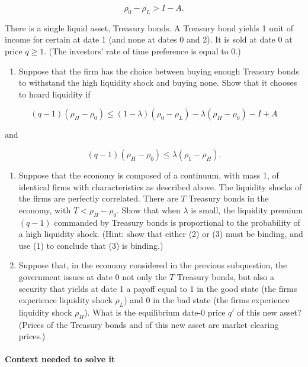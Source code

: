 \documentclass[11pt,a4paper]{article}
\providecommand{\tightlist}{\setlength{\itemsep}{0pt}\setlength{\parskip}{0pt}}
\begin{document}
\[\rho_0 - \rho_L > I - A. \tag{1}\]

There is a single liquid asset, Treasury bonds. A Treasury bond yields 1 unit of income for certain
at date 1 (and none at dates 0 and 2). It is sold at date 0 at price \(q \geqslant 1\). (The
investors' rate of time preference is equal to 0.)

\begin{enumerate}
\def\labelenumi{(\roman{enumi})}
\tightlist
\item
  Suppose that the firm has the choice between buying enough Treasury bonds to withstand the high
  liquidity shock and buying none. Show that it chooses to hoard liquidity if
\end{enumerate}

\[(q-1)(\rho_H - \rho_0) \leqslant (1-\lambda)(\rho_0 - \rho_L) - \lambda(\rho_H - \rho_0) - I + A \tag{2}\]

and

\[(q-1)(\rho_H - \rho_0) \leqslant \lambda(\rho_1 - \rho_H). \tag{3}\]

\begin{enumerate}
\def\labelenumi{(\roman{enumi})}
\setcounter{enumi}{1}
\item
  Suppose that the economy is composed of a continuum, with mass 1, of identical firms with
  characteristics as described above. The liquidity shocks of the firms are perfectly correlated.
  There are \(T\) Treasury bonds in the economy, with \(T < \rho_H - \rho_0\). Show that when
  \(\lambda\) is small, the liquidity premium \((q-1)\) commanded by Treasury bonds is proportional
  to the probability of a high liquidity shock. (Hint: show that either (2) or (3) must be binding,
  and use (1) to conclude that (3) is binding.)
\item
  Suppose that, in the economy considered in the previous subquestion, the government issues at date
  0 not only the \(T\) Treasury bonds, but also a security that yields at date 1 a payoff equal to 1
  in the good state (the firms experience liquidity shock \(\rho_L\)) and 0 in the bad state (the
  firms experience liquidity shock \(\rho_H\)). What is the equilibrium date-0 price \(q'\) of this
  new asset? (Prices of the Treasury bonds and of this new asset are market clearing prices.)
\end{enumerate}

\paragraph{Context needed to solve it}
\end{document}
